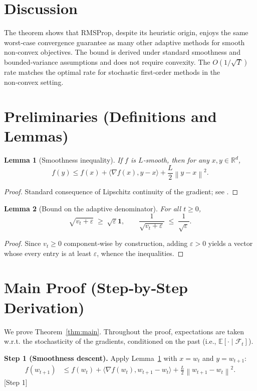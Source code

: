 \documentclass{article}
\newcommand{\EE}{\mathbb{E}}
\newcommand{\RR}{\mathbb{R}}
\newcommand{\norm}[1]{\left\lVert#1\right\rVert}
\newtheorem{lemma}{Lemma}
\begin{document}
\section*{Discussion}
The theorem shows that RMSProp, despite its heuristic origin, enjoys the same worst‑case convergence guarantee as many other adaptive methods for smooth non‑convex objectives. The bound is derived under standard smoothness and bounded‑variance assumptions and does not require convexity. The $O(1/\sqrt{T})$ rate matches the optimal rate for stochastic first‑order methods in the non‑convex setting.

\newpage
\section*{Preliminaries (Definitions and Lemmas)}
\begin{lemma}[Smoothness inequality]\label{lem:smooth}
If $f$ is $L$‑smooth, then for any $x,y\in\RR^{d}$,
\[
f(y)\le f(x)+\langle\nabla f(x),y-x\rangle+\frac{L}{2}\norm{y-x}^{2}.
\tag{7}
\]
\end{lemma}
\begin{proof}
Standard consequence of Lipschitz continuity of the gradient; see \cite{Nesterov2004}.
\end{proof}

\begin{lemma}[Bound on the adaptive denominator]\label{lem:denom}
For all $t\ge0$,
\[
\sqrt{v_{t}+\varepsilon}\;\ge\;\sqrt{\varepsilon}\mathbf{1},
\qquad
\frac{1}{\sqrt{v_{t}+\varepsilon}}\;\le\;\frac{1}{\sqrt{\varepsilon}}.
\tag{8}
\]
\end{lemma}
\begin{proof}
Since $v_{t}\ge0$ component‑wise by construction, adding $\varepsilon>0$ yields a vector whose every entry is at least $\varepsilon$, whence the inequalities.
\end{proof}

\section*{Main Proof (Step‑by‑Step Derivation)}
We prove Theorem~\ref{thm:main}. Throughout the proof, expectations are taken w.r.t. the stochasticity of the gradients, conditioned on the past (i.e., $\EE[\cdot\mid\mathcal{F}_{t}]$).

\noindent\textbf{Step 1 (Smoothness descent).}  
Apply Lemma~\ref{lem:smooth} with $x=w_{t}$ and $y=w_{t+1}$:
\begin{align}
f(w_{t+1})
&\le f(w_{t})+\langle\nabla f(w_{t}),w_{t+1}-w_{t}\rangle
   +\frac{L}{2}\norm{w_{t+1}-w_{t}}^{2}. \tag{9}
\end{align}
[Step 1]
\end{document}
